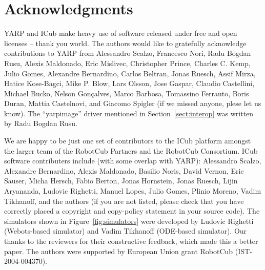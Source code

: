 
\section{Acknowledgments}

YARP and ICub make heavy use of software released under free and open
licenses -- thank you world.
%
The authors would like to gratefully acknowledge contributions to YARP
from Alessandro Scalzo, Francesco Nori, Radu Bogdan Rusu, 
Alexis Maldonado, Eric Mislivec, Christopher
Prince, Charles C. Kemp, Julio Gomes, Alexandre
Bernardino, Carlos Beltran, Jonas Ruesch, Assif Mirza, Hatice
Kose-Bagci, Mike P. Blow, Lars Olsson,
Jose Gaspar, Claudio Castellini, Michael Bucko, Nelson
Gon\c calves, Marco Barbosa, Tomassino Ferrauto, Boris Duran, Mattia
Castelnovi, and Giacomo Spigler 
 (if we missed anyone, plese let us
know).  
%
The ``yarpimage'' driver mentioned in Section~\ref{sect:interop}
was written by Radu Bogdan Rusu.

We are happy to be just one set of contributors to the ICub platform
amongst the larger team of the RobotCub Partners and the RobotCub
Consortium.
%
ICub software contributers include (with some overlap with YARP):
Alessandro Scalzo, Alexandre Bernardino, Alexis Maldonado, Basilio
Noris, David Vernon, Eric Sauser, Micha Hersch, Fabio Berton, 
Jonas Hornstein, Jonas Ruesch, Lijin Aryananda, 
Ludovic Righetti, Manuel Lopes, Julio Gomes, Plinio
Moreno, Vadim Tikhanoff, and 
the authors (if you are not listed, please check that
you have correctly placed a copyright and copy-policy statement in
your source code).
%
%
The simulators shown in Figure~\ref{fig:simulators} were developed 
by Ludovic Righetti (Webots-based simulator) and
Vadim Tikhanoff (ODE-based simulator).
%
Our thanks to the reviewers for their constructive feedback, which
made this a better paper.
%
The authors were supported by European Union
grant RobotCub (IST-2004-004370).




